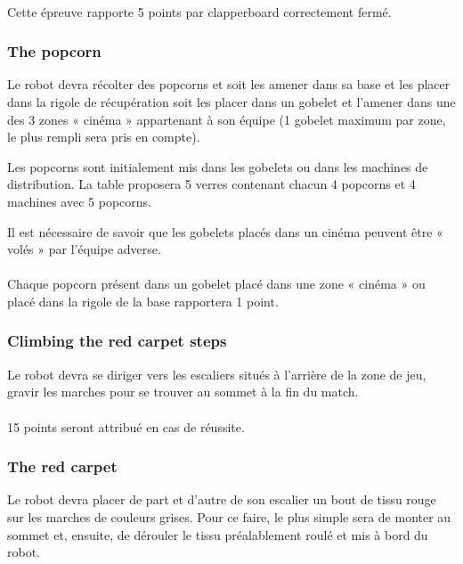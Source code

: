 \paragraph{}
Cette épreuve rapporte 5 points par clapperboard correctement fermé.

\subsubsection{The popcorn}
Le robot devra récolter des popcorns et soit les amener dans sa base et les placer dans la rigole de récupération soit les placer dans un gobelet et l’amener dans une des 3 zones « cinéma » appartenant à son équipe (1 gobelet maximum par zone, le plus rempli sera pris en compte). 

\noindent Les popcorns sont initialement mis dans les gobelets ou dans les machines de distribution. La table proposera 5 verres contenant chacun 4 popcorns et 4 machines avec 5 popcorns.

\noindent Il est nécessaire de savoir que les gobelets placés dans un cinéma peuvent être « volés » par l’équipe adverse.

\paragraph{}
Chaque popcorn présent dans un gobelet placé dans une zone « cinéma » ou placé dans la rigole de la base rapportera 1 point.

\subsubsection{Climbing the red carpet steps}
Le robot devra se diriger vers les escaliers situés à l'arrière de la zone de jeu, gravir les marches pour se trouver au sommet à la fin du match.

\paragraph{}
15 points seront attribué en cas de réussite.

\subsubsection{The red carpet}
Le robot devra placer de part et d’autre de son escalier un bout de tissu rouge sur les marches de couleurs grises. Pour ce faire, le plus simple sera de monter au sommet et, ensuite, de dérouler le tissu préalablement roulé et mis à bord du robot. 

